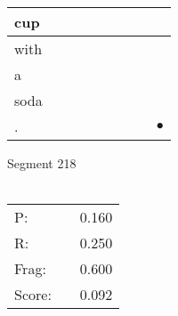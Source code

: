 \documentclass[landscape]{article}
\newcommand{\ssp}{\hspace{2pt}}
\newcommand{\mex}{\cellcolor{g}$\bullet$}
\begin{document}
\begin{tabular}{|l|p{10pt}|p{10pt}|p{10pt}|p{10pt}|p{10pt}|p{10pt}|p{10pt}|p{10pt}|}
\hline
\ssp cup \ssp&\hspace{2pt}&\hspace{2pt}&\hspace{2pt}&\hspace{2pt}&\hspace{2pt}&\hspace{2pt}&\hspace{2pt}&\hspace{2pt}\\
\hline
\ssp with \ssp&\hspace{2pt}&\hspace{2pt}&\hspace{2pt}&\hspace{2pt}&\hspace{2pt}&\hspace{2pt}&\hspace{2pt}&\hspace{2pt}\\
\hline
\ssp a \ssp&\hspace{2pt}&\hspace{2pt}&\hspace{2pt}&\hspace{2pt}&\hspace{2pt}&\hspace{2pt}&\hspace{2pt}&\hspace{2pt}\\
\hline
\ssp soda \ssp&\hspace{2pt}&\hspace{2pt}&\hspace{2pt}&\hspace{2pt}&\hspace{2pt}&\hspace{2pt}&\hspace{2pt}&\hspace{2pt}\\
\hline
\ssp \cellcolor{ref7}. \ssp&\hspace{2pt}&\hspace{2pt}&\hspace{2pt}&\hspace{2pt}&\hspace{2pt}&\hspace{2pt}&\hspace{2pt}&\hspace{2pt}\mex\\
\hline
\end{tabular}

\vspace{6pt}
\noindent Segment 218\\\\
\noindent\begin{tabular}{lm{12pt}r}
\hline
P:&&0.160\\
R:&&0.250\\
Frag:&&0.600\\
Score:&&0.092\\
\end{tabular}
\end{document}

